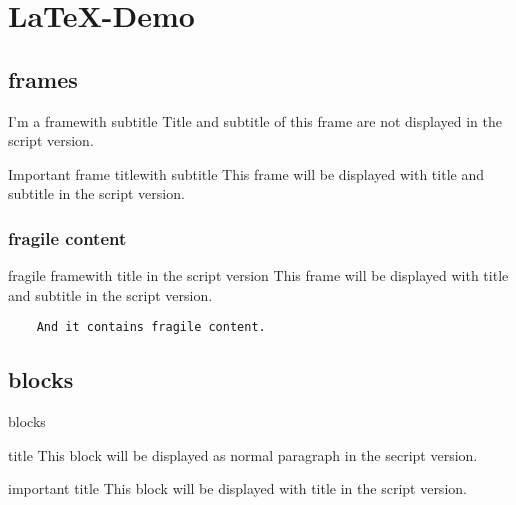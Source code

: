 \chapter{\LaTeX-Demo}


\section{frames}

\begin{frame}{I'm a frame}{with subtitle}
  Title and subtitle of this frame are not displayed in the script version.
\end{frame}

\begin{Frame}{Important frame title}{with subtitle}
  This frame will be displayed with title and subtitle in the script version.
\end{Frame}

\subsection{fragile content}

\begin{Frame}[fragile]{fragile frame}{with title in the script version}
  This frame will be displayed with title and subtitle in the script version.
  
  \begin{verbatim}
    And it contains fragile content.
  \end{verbatim}
\end{Frame}

\section{blocks}

\begin{frame}{blocks}
  \begin{block}{title}
    This block will be displayed as normal paragraph in the secript version.
  \end{block}
  
  \begin{Block}{important title}
    This block will be displayed with title in the script version.
  \end{Block}
\end{frame}

